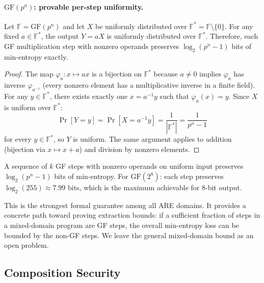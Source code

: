 \documentclass[sigconf,anonymous,review]{acmart}
\theoremstyle{acmdefinition}%
\theoremstyle{acmplain}%
\newcommand{\are}{\textsc{ARE}\xspace}
\begin{document}
\paragraph{$\mathrm{GF}(p^n)$: provable per-step uniformity.}

\begin{theorem}
\label{thm:gf-uniform}
Let $\mathbb{F} = \mathrm{GF}(p^n)$ and let $X$ be uniformly
distributed over $\mathbb{F}^* = \mathbb{F} \setminus \{0\}$.
%
For any fixed $a \in \mathbb{F}^*$, the output $Y = aX$ is
uniformly distributed over $\mathbb{F}^*$.
%
Therefore, each GF multiplication step with nonzero operands
preserves $\log_2(p^n - 1)$ bits of min-entropy exactly.
\end{theorem}

\begin{proof}
The map $\varphi_a: x \mapsto ax$ is a bijection on
$\mathbb{F}^*$ because $a \neq 0$ implies $\varphi_a$ has inverse
$\varphi_{a^{-1}}$ (every nonzero element has a multiplicative
inverse in a finite field).
%
For any $y \in \mathbb{F}^*$, there exists exactly one
$x = a^{-1}y$ such that $\varphi_a(x) = y$.
%
Since $X$ is uniform over $\mathbb{F}^*$:
\[
  \Pr[Y = y] = \Pr[X = a^{-1}y] = \frac{1}{|\mathbb{F}^*|}
  = \frac{1}{p^n - 1}
\]
for every $y \in \mathbb{F}^*$, so $Y$ is uniform.
%
The same argument applies to addition (bijection via
$x \mapsto x + a$) and division by nonzero elements.
\end{proof}

\begin{corollary}
\label{cor:gf-chain}
A sequence of $k$ GF steps with nonzero operands on uniform input
preserves $\log_2(p^n - 1)$ bits of min-entropy.
%
For $\mathrm{GF}(2^8)$: each step preserves $\log_2(255) \approx
7.99$ bits, which is the maximum achievable for 8-bit output.
\end{corollary}

This is the strongest formal guarantee among all \are domains.
%
It provides a concrete path toward proving extraction bounds:
if a sufficient fraction of steps in a mixed-domain program are
GF steps, the overall min-entropy loss can be bounded by the
non-GF steps.
%
We leave the general mixed-domain bound as an open problem.

\subsection{Composition Security}
\label{sec:security:composition}
\end{document}
